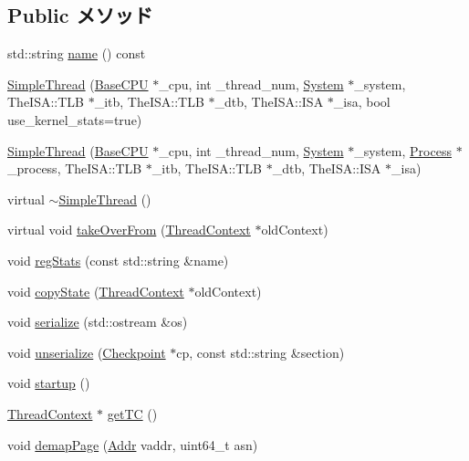 \subsection*{Public メソッド}
\begin{DoxyCompactItemize}
\item 
std::string \hyperlink{classSimpleThread_a37627d5d5bba7f4a8690c71c2ab3cb07}{name} () const 
\item 
\hyperlink{classSimpleThread_a1b31d6552d3e1bc9e3fe401d56a03aef}{SimpleThread} (\hyperlink{classBaseCPU}{BaseCPU} $\ast$\_\-cpu, int \_\-thread\_\-num, \hyperlink{classSystem}{System} $\ast$\_\-system, TheISA::TLB $\ast$\_\-itb, TheISA::TLB $\ast$\_\-dtb, TheISA::ISA $\ast$\_\-isa, bool use\_\-kernel\_\-stats=true)
\item 
\hyperlink{classSimpleThread_a1ed204eb6f914d3ab1f5df02379012c6}{SimpleThread} (\hyperlink{classBaseCPU}{BaseCPU} $\ast$\_\-cpu, int \_\-thread\_\-num, \hyperlink{classSystem}{System} $\ast$\_\-system, \hyperlink{classProcess}{Process} $\ast$\_\-process, TheISA::TLB $\ast$\_\-itb, TheISA::TLB $\ast$\_\-dtb, TheISA::ISA $\ast$\_\-isa)
\item 
virtual \hyperlink{classSimpleThread_a2504f376b7b0a45d380e5af6f189458d}{$\sim$SimpleThread} ()
\item 
virtual void \hyperlink{classSimpleThread_a5811640aa3008d2916f3d3aba621b82d}{takeOverFrom} (\hyperlink{classThreadContext}{ThreadContext} $\ast$oldContext)
\item 
void \hyperlink{classSimpleThread_a3dd3443357312bcb75580eaa508c48a4}{regStats} (const std::string \&name)
\item 
void \hyperlink{classSimpleThread_a51d24d05286ee0c24574372ca4c517b6}{copyState} (\hyperlink{classThreadContext}{ThreadContext} $\ast$oldContext)
\item 
void \hyperlink{classSimpleThread_a53e036786d17361be4c7320d39c99b84}{serialize} (std::ostream \&os)
\item 
void \hyperlink{classSimpleThread_af22e5d6d660b97db37003ac61ac4ee49}{unserialize} (\hyperlink{classCheckpoint}{Checkpoint} $\ast$cp, const std::string \&section)
\item 
void \hyperlink{classSimpleThread_aecc7d8debf54990ffeaaed5bac7d7d81}{startup} ()
\item 
\hyperlink{classThreadContext}{ThreadContext} $\ast$ \hyperlink{classSimpleThread_a81894d15db5190d5364449a4915b76f5}{getTC} ()
\item 
void \hyperlink{classSimpleThread_a2d698ff909513b48a1263f8a5440e067}{demapPage} (\hyperlink{base_2types_8hh_af1bb03d6a4ee096394a6749f0a169232}{Addr} vaddr, uint64\_\-t asn)

\end{DoxyCompactItemize}
